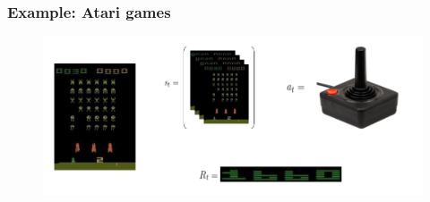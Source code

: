 \begin{frame}
    \frametitle{Example: Atari games}
    \begin{figure}
        \centering
        \includegraphics[width=\textwidth]{./imgs/img_rl_mdp_atari.png}
    \end{figure}
\end{frame}

